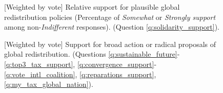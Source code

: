 \begin{figure}[h!]
\begin{subfigure}{.49\textwidth}
\end{subfigure}
\end{figure}

\begin{figure}[h!]
    \caption[{[}Weighted by vote{]} Relative support for plausible global policies]{[Weighted by vote] Relative support for plausible global redistribution policies (Percentage of \textit{Somewhat} or \textit{Strongly support} among non-\textit{Indifferent} responses). (Question \ref{q:solidarity_support}).
    }\label{fig:solidarity_support_share_weight_vote}
\end{figure}
\begin{figure}[h!]
    \caption[{[}Weighted by vote{]} Support for broad or radical global redistribution]{[Weighted by vote] Support for broad action or radical proposals of global redistribution. \hfill (Questions \ref{q:sustainable_future}-\ref{q:top3_tax_support}, \ref{q:convergence_support}-\ref{q:vote_intl_coalition}, \ref{q:reparations_support}, \ref{q:my_tax_global_nation}).
    }\label{fig:radical_redistr_share_weight_vote} 
\end{figure}

